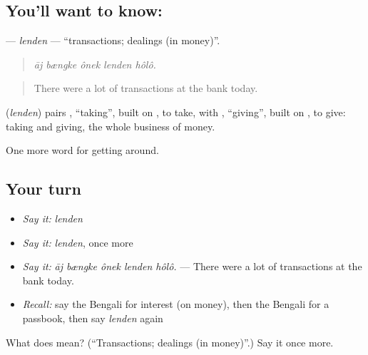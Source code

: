 \subsection*{You'll want to know: }
\textbf{} — \emph{lenden} — \textquotedblleft{}transactions; dealings (in money)\textquotedblright{}.

\begin{quote}
    
\end{quote}

\begin{quote}
\emph{āj bængke ônek lenden hôlô.}
\end{quote}

\begin{quote}
There were a lot of transactions at the bank today.
\end{quote}

\begin{cousinweb}
\textbf{} (\emph{lenden}) pairs , \textquotedblleft{}taking\textquotedblright{}, built on \textbf{}, to take, with , \textquotedblleft{}giving\textquotedblright{}, built on , to give: taking and giving, the whole business of money.
\end{cousinweb}

\begin{grammarlens}[title={What you've built}]
One more word for getting around.
\end{grammarlens}

\subsection*{Your turn}
\begin{itemize}
\raggedright
  \item \emph{Say it:} \emph{lenden}
  \item \emph{Say it:} \emph{lenden}, once more
  \item \emph{Say it:} \emph{āj bængke ônek lenden hôlô.} — There were a lot of transactions at the bank today.
  \item \emph{Recall:} say the Bengali for interest (on money), then the Bengali for a passbook, then say \emph{lenden} again
\end{itemize}

\begin{tcolorbox}[breakable,colback=teal!4,colframe=teal!35!black,title={Before you move on}]
What does  mean? (\textquotedblleft{}Transactions; dealings (in money)\textquotedblright{}.) Say it once more.
\end{tcolorbox}
